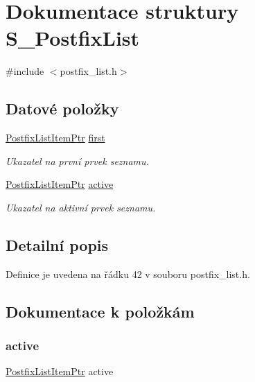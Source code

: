 \hypertarget{struct_s___postfix_list}{}\section{Dokumentace struktury S\+\_\+\+Postfix\+List}
\label{struct_s___postfix_list}


{\ttfamily \#include $<$postfix\+\_\+list.\+h$>$}

\subsection*{Datové položky}
\begin{DoxyCompactItemize}
\item 
\hyperlink{postfix__list_8h_a8feb56873a59e2796c49dce10bc3d21c}{Postfix\+List\+Item\+Ptr} \hyperlink{struct_s___postfix_list_a020add97bb92cd6b0f237d2d7f8b86e3}{first}
\begin{DoxyCompactList}\small\item\em Ukazatel na první prvek seznamu. \end{DoxyCompactList}\item 
\hyperlink{postfix__list_8h_a8feb56873a59e2796c49dce10bc3d21c}{Postfix\+List\+Item\+Ptr} \hyperlink{struct_s___postfix_list_a7d816e76fee0b264ad4e5ee60e084453}{active}
\begin{DoxyCompactList}\small\item\em Ukazatel na aktivní prvek seznamu. \end{DoxyCompactList}\end{DoxyCompactItemize}


\subsection{Detailní popis}


Definice je uvedena na řádku 42 v souboru postfix\+\_\+list.\+h.



\subsection{Dokumentace k položkám}
\mbox{\label{struct_s___postfix_list_a7d816e76fee0b264ad4e5ee60e084453}} 
\subsubsection{\texorpdfstring{active}{active}}
{\footnotesize\ttfamily \hyperlink{postfix__list_8h_a8feb56873a59e2796c49dce10bc3d21c}{Postfix\+List\+Item\+Ptr} active}



